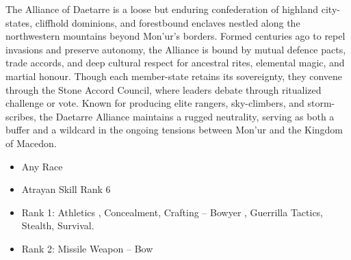 
The Alliance of Daetarre is a loose but enduring confederation of highland city-states, cliffhold dominions, and forestbound enclaves nestled along the northwestern mountains beyond Mon’ur’s borders. Formed centuries ago to repel invasions and preserve autonomy, the Alliance is bound by mutual defence pacts, trade accords, and deep cultural respect for ancestral rites, elemental magic, and martial honour. Though each member-state retains its sovereignty, they convene through the Stone Accord Council, where leaders debate through ritualized challenge or vote. Known for producing elite rangers, sky-climbers, and storm-scribes, the Daetarre Alliance maintains a rugged neutrality, serving as both a buffer and a wildcard in the ongoing tensions between Mon’ur and the Kingdom of Macedon.

\begin{itemize}
\item Any Race
\item Atrayan Skill Rank 6
\item Rank 1: Athletics , Concealment, Crafting – Bowyer , Guerrilla Tactics, Stealth, Survival.
\item Rank 2: Missile Weapon – Bow
\end{itemize}